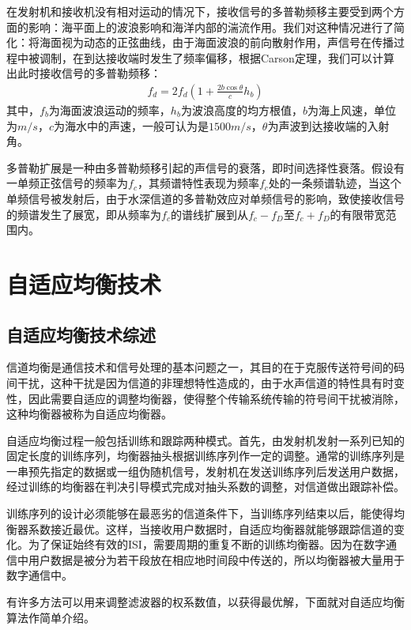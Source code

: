 在发射机和接收机没有相对运动的情况下，接收信号的多普勒频移主要受到两个方面的影响：海平面上的波浪影响和海洋内部的湍流作用。我们对这种情况进行了简化：将海面视为动态的正弦曲线，由于海面波浪的前向散射作用，声信号在传播过程中被调制，在到达接收端时发生了频率偏移，根据Carson定理，我们可以计算出此时接收信号的多普勒频移：
\begin{eqnarray}
    f_d=2f_d\left(1+\frac{2b\cos\theta}{c}h_b\right)
    \label{equ:2.5}
\end{eqnarray}
其中，$f_b$为海面波浪运动的频率，$h_b$为波浪高度的均方根值，$b$为海上风速，单位为$m/s$，$c$为海水中的声速，一般可认为是$1500m/s$，$\theta$为声波到达接收端的入射角。

多普勒扩展是一种由多普勒频移引起的声信号的衰落，即时间选择性衰落。假设有一单频正弦信号的频率为$f_c$，其频谱特性表现为频率$f_c$处的一条频谱轨迹，当这个单频信号被发射后，由于水深信道的多普勒效应对单频信号的影响，致使接收信号的频谱发生了展宽，即从频率为$f_c$的谱线扩展到从$f_c-f_D$至$f_c+f_D$的有限带宽范围内。
\section{自适应均衡技术}
\subsection{自适应均衡技术综述}
信道均衡是通信技术和信号处理的基本问题之一，其目的在于克服传送符号间的码间干扰，这种干扰是因为信道的非理想特性造成的，由于水声信道的特性具有时变性，因此需要自适应的调整均衡器，使得整个传输系统传输的符号间干扰被消除，这种均衡器被称为自适应均衡器。

自适应均衡过程一般包括训练和跟踪两种模式。首先，由发射机发射一系列已知的固定长度的训练序列，均衡器抽头根据训练序列作一定的调整。通常的训练序列是一串预先指定的数据或一组伪随机信号，发射机在发送训练序列后发送用户数据，经过训练的均衡器在判决引导模式完成对抽头系数的调整，对信道做出跟踪补偿。

训练序列的设计必须能够在最恶劣的信道条件下，当训练序列结束以后，能使得均衡器系数接近最优。这样，当接收用户数据时，自适应均衡器就能够跟踪信道的变化。为了保证始终有效的ISI，需要周期的重复不断的训练均衡器。因为在数字通信中用户数据是被分为若干段放在相应地时间段中传送的，所以均衡器被大量用于数字通信中。

有许多方法可以用来调整滤波器的权系数值，以获得最优解，下面就对自适应均衡算法作简单介绍。
